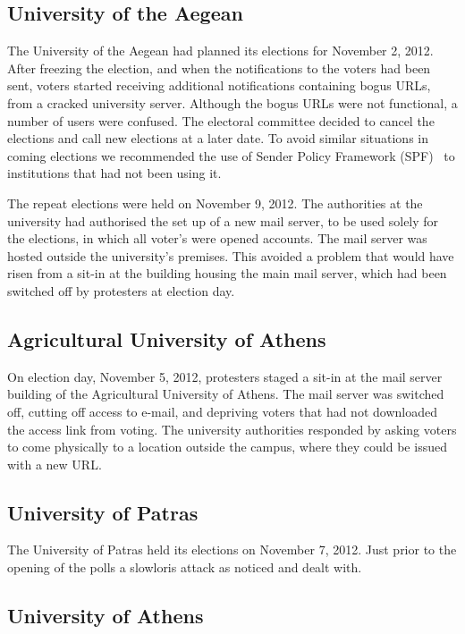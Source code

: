 \documentclass[letterpaper,10pt]{article}
\begin{document}
\subsection{University of the Aegean}

The University of the Aegean had planned its elections for November 2,
2012. After freezing the election, and when the notifications to the
voters had been sent, voters started receiving additional
notifications containing bogus URLs, from a cracked university server.
Although the bogus URLs were not functional, a number of users were
confused. The electoral committee decided to cancel the elections and
call new elections at a later date. To avoid similar situations in
coming elections we recommended the use of Sender Policy Framework
(SPF)~\cite{rfc4408} to institutions that had not been using it.

The repeat elections were held on November 9, 2012. The authorities at
the university had authorised the set up of a new mail server, to be
used solely for the elections, in which all voter's were opened
accounts. The mail server was hosted outside the university's
premises. This avoided a problem that would have risen from a sit-in
at the building housing the main mail server, which had been switched
off by protesters at election day.

\subsection{Agricultural University of Athens}

On election day, November 5, 2012, protesters staged a sit-in at the
mail server building of the Agricultural University of Athens. The
mail server was switched off, cutting off access to e-mail, and
depriving voters that had not downloaded the access link from voting.
The university authorities responded by asking voters to come
physically to a location outside the campus, where they could be
issued with a new URL.

\subsection{University of Patras}

The University of Patras held its elections on November 7, 2012. Just
prior to the opening of the polls a slowloris attack as noticed and
dealt with.

\subsection{University of Athens}
\end{document}
